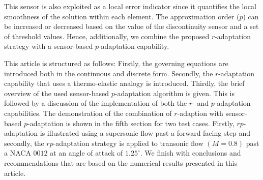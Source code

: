 \documentclass[review]{elsarticle}
\begin{document}
\par This sensor is also exploited as a local error indicator since it quantifies the local smoothness of the solution within each element. The approximation order ($p$) can be increased or decreased based on the value of the discontinuity sensor and a set of threshold values. Hence, additionally, we combine the proposed $r$-adaptation strategy with a sensor-based $p$-adaptation capability.


\par This article is structured as follows: Firstly, the governing equations are introduced both in the continuous and discrete form. Secondly, the $r$-adaptation capability that uses a thermo-elastic analogy is introduced.	 	Thirdly, the brief overview of the used sensor-based $p$-adaptation algorithm is given.	This is followed by a discussion of the implementation of both the $r$- and $p$-adaptation capabilities.	The demonstration of the combination of $r$-adaption with sensor-based $p$-adaptation is shown in the fifth section for two test cases.	Firstly, $rp$-adaptation is illustrated using a supersonic flow past a forward facing step and secondly, the $rp$-adaptation strategy is applied to transonic flow $(M=0.8)$ past a NACA $0012$ at an angle of attack of $1.25^\circ$.	We finish with conclusions and recommendations that are based on the numerical results presented in this article.
    
\end{document}
